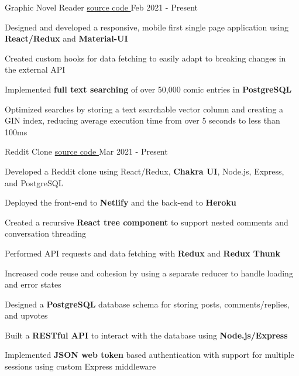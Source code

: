 
\begin{cventries}
  \cventry
    {\fontsize{10pt}{1em}\bodyfont\upshape\color{text}{Front-end comic reading client for the MangaDex API}} %
    {Graphic Novel Reader} %
    {\href{https://github.com/tacticaltofu/mangastack}{source code \faExternalLink}} %
    {Feb 2021 - Present} %
    {
      \begin{cvitems} %
        \item {Designed and developed a responsive, mobile first single page application using \textbf{React/Redux} and \textbf{Material-UI}}
        \item {Created custom hooks for data fetching to easily adapt to breaking changes in the external API}
        \item {Implemented \textbf{full text searching} of over 50,000 comic entries in \textbf{PostgreSQL}}
        \item {Optimized searches by storing a text searchable vector column and creating a GIN index, reducing average execution time from over 5 seconds to less than 100ms}
      \end{cvitems}
    }
    
  \cventry
    {\fontsize{10pt}{1em}\bodyfont\upshape\color{text}{News aggregation and discussion website very similar to Reddit}} %
    {Reddit Clone} %
    {\href{https://github.com/tacticaltofu/reddit-clone}{source code \faExternalLink}} %
    {Mar 2021 - Present} %
    {
      \begin{cvitems} %
        \item {Developed a Reddit clone using React/Redux, \textbf{Chakra UI}, Node.js, Express, and PostgreSQL}
        \item {Deployed the front-end to \textbf{Netlify} and the back-end to \textbf{Heroku} }
        \item {Created a recursive \textbf{React tree component} to support nested comments and conversation threading}
        \item {Performed API requests and data fetching with \textbf{Redux} and \textbf{Redux Thunk}}
        \item {Increased code reuse and cohesion by using a separate reducer to handle loading and error states}
        \item {Designed a \textbf{PostgreSQL} database schema for storing posts, comments/replies, and upvotes}
        \item {Built a \textbf{RESTful API} to interact with the database using \textbf{Node.js/Express}}
        \item {Implemented \textbf{JSON web token} based authentication with support for multiple sessions using custom Express middleware}
      \end{cvitems}
    }
\end{cventries}